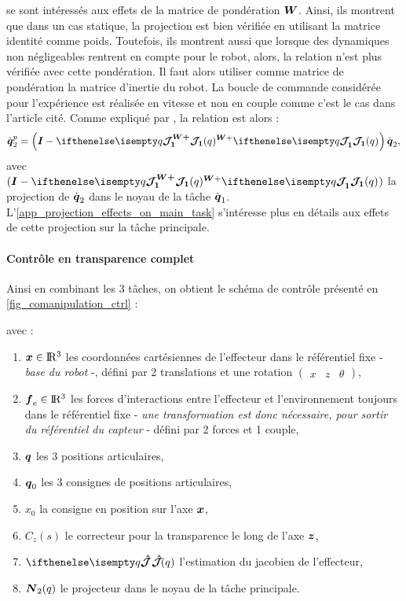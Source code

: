 \documentclass[12pt, a4paper]{article} %
\numberwithin{equation}{section}
\begin{document}
\cite{dietrich_overview_2015} se sont intéressés aux effets de la matrice de pondération $ \matr{W} $. Ainsi, ils montrent que dans un cas statique, la projection est bien vérifiée en utilisant la matrice identité comme poids. Toutefois, ils montrent aussi que lorsque des dynamiques non négligeables rentrent en compte pour le robot, alors, la relation n'est plus vérifiée avec cette pondération. Il faut alors utiliser comme matrice de pondération la matrice d'inertie du robot.
%
\newlineBlank
%
La boucle de commande considérée pour l'expérience est réalisée en vitesse et non en couple comme c'est le cas dans l'article cité. Comme expliqué par \cite{sadeghian_multi-priority_2011}, la relation est alors :
%
\begin{equation} \label{eq_null_space_proj_velocities}
	\dot{\vect{q}}_2^p = \left(\matr{I} - \jacobian{q}{1}{\matr{W}+} \jacobian{q}{1}{}\right)\dot{\vect{q}}_2,
\end{equation}
%
avec $ (\matr{I} - \jacobian{q}{1}{\matr{W}+} \jacobian{q}{1}{}) $ la projection de $ \dot{\vect{q}}_2 $ dans le noyau de la tâche $ \dot{\vect{q}}_1 $. L'\cref{app_projection_effects_on_main_task} s'intéresse plus en détails aux effets de cette projection sur la tâche principale.

\paragraph{Contrôle en transparence complet}

Ainsi en combinant les 3 tâches, on obtient le schéma de contrôle présenté en \cref{fig_comanipulation_ctrl} :


%
avec : 
\begin{enumerate}
	\item[•] $ \vect{x} \in \R^3 $ les coordonnées cartésiennes de l'effecteur dans le référentiel fixe - \textit{base du robot} -, défini par 2 translations et une rotation $ \begin{pmatrix} x & z & \theta \end{pmatrix} $, 
	\item[•] $ \vect{f}_e \in \R^3 $ les forces d'interactions entre l'effecteur et l'environnement toujours dans le référentiel fixe - \textit{une transformation est donc nécessaire, pour sortir du référentiel du capteur} - défini par 2 forces et 1 couple, 
	\item[•] $ \vect{q} $ les 3 positions articulaires,
	\item[•] $ \vect{q}_0 $ les 3 consignes de positions articulaires,
	\item[•] $ x_0 $ la consigne en position sur l'axe $ \vect{x} $,
	\item[•] $ C_z(s) $ le correcteur pour la transparence le long de l'axe $ \vect{z} $,
	\item[•] $ \jacobianHat{q}{}{} $ l'estimation du jacobien de l'effecteur,
	\item[•] $ \matr{N}_2(q) $ le projecteur dans le noyau de la tâche principale.	
\end{enumerate}
\end{document}
